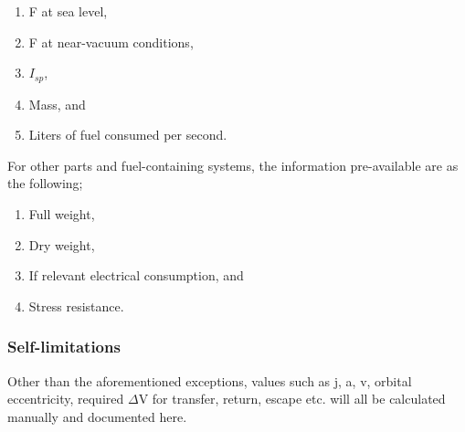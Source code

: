 \documentclass[12pt]{article}
\begin{document}
    \begin{enumerate}
        \item F at sea level,
        \item F at near-vacuum conditions,
        \item $I_{sp}$,
        \item Mass, and
        \item Liters of fuel consumed per second.
    \end{enumerate}
    For other parts and fuel-containing systems, the information pre-available are as the following;
    \begin{enumerate}
        \item Full weight,
        \item Dry weight, 
        \item If relevant electrical consumption, and
        \item Stress resistance.
    \end{enumerate}
    \subsubsection{Self-limitations}
    Other than the aforementioned exceptions, values such as j, a, v, orbital eccentricity, required \(\Delta \)V for transfer, return, escape etc. will all be calculated manually and documented here.
\end{document}
